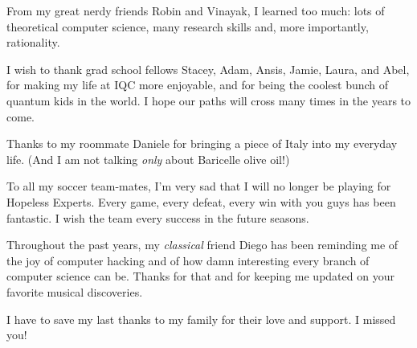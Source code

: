 From my great nerdy friends Robin and Vinayak, I learned too much: lots of theoretical computer science, 
many research skills and, more importantly, rationality.

I wish to thank grad school fellows Stacey, Adam, Ansis, Jamie, Laura, and Abel, for making
my life at IQC more enjoyable, and for being the coolest bunch of quantum kids in the world.
I hope our paths will cross many times in the years to come. 

Thanks to my roommate Daniele for bringing a piece of Italy into my everyday life. 
(And I am not talking \emph{only} about Baricelle olive oil!)

To all my soccer team-mates, I'm very sad 
that I will no longer be playing for Hopeless Experts.
Every game, every defeat, every win with you guys has been fantastic. 
I wish the team every success in the future seasons.  

Throughout the past years, my \emph{classical} friend Diego has been reminding me of 
the joy of computer hacking and of how damn interesting every branch of computer science can be.
Thanks for that and for keeping me updated on your favorite musical discoveries.

I have to save my last thanks to my family for their love and support. 
I missed you!


\cleardoublepage
\newpage




\renewcommand\contentsname{Table of Contents}
\tableofcontents
\cleardoublepage
{}

\listoftables
\cleardoublepage
{}		%

\listoffigures
\cleardoublepage
{}		%



